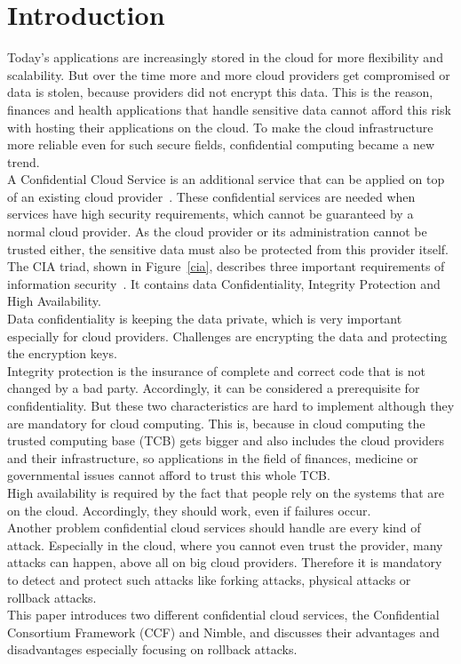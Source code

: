 \section{Introduction}
Today's applications are increasingly stored in the cloud for more flexibility and scalability. 
 But over the time more and more cloud providers get compromised or data is stolen, because providers did not encrypt this data. This is the reason, finances and health applications that handle sensitive data cannot afford this risk with hosting their applications on the cloud. To make the cloud infrastructure more reliable even for such secure fields, confidential computing became a new trend.\\
 A Confidential Cloud Service is an additional service that can be applied on top of an existing cloud provider~\cite{confidentiality}. These confidential services are needed when services have high security requirements, which cannot be guaranteed by a normal cloud provider. As the cloud provider or its administration cannot be trusted either, the sensitive data must also be protected from this provider itself. \\
 The CIA triad,  shown in Figure~\ref{cia},  describes three important requirements of information security~\cite{ciaBook, cia}. It contains data Confidentiality, Integrity Protection and High Availability.\\
 Data confidentiality is keeping the data private, which is very important especially for cloud providers. Challenges are encrypting the data and protecting the encryption keys.\\
 Integrity protection is the insurance of complete and correct code that is not changed by a bad party. Accordingly, it can be considered a prerequisite for confidentiality. But these two characteristics are hard to implement although they are mandatory for cloud computing. This is, because in cloud computing the trusted computing base (TCB) gets bigger and also includes the cloud providers and their infrastructure, so applications in the field of finances, medicine or governmental issues cannot afford to trust this whole TCB.\\
 High availability is required by the fact that people rely on the systems that are on the cloud. Accordingly, they should work, even if failures occur.\\
 Another problem confidential cloud services should handle are every kind of attack. Especially in the cloud, where you cannot even trust the provider, many attacks can happen, above all on big cloud providers. Therefore it is mandatory to detect and protect such attacks like forking attacks, physical attacks or rollback attacks.\\
 This paper introduces two different confidential cloud services, the Confidential Consortium Framework (CCF) and Nimble,  and discusses their advantages and disadvantages especially focusing on rollback attacks. 
	 